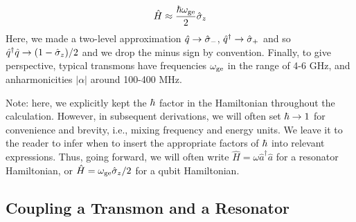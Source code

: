 \begin{equation}
    \hat{H} \approx \frac{\hbar\omega_{\rm ge}}{2}\hat{\sigma}_z
\end{equation}
Here, we made a two-level approximation $\hat{q} \to \hat{\sigma}_-$, $\hat{q}^\dagger \to \hat{\sigma}_+$ and so $\hat{q}^\dagger \hat{q} \to (1 - \hat{\sigma}_z)/2$ and we drop the minus sign by convention. Finally, to give perspective, typical transmons have frequencies $\omega_{\rm ge}$ in the range of 4-6 GHz, and anharmonicities $|\alpha|$ around 100-400 MHz. 

\noindent Note: here, we explicitly kept the $\hbar$ factor in the Hamiltonian throughout the calculation. However, in subsequent derivations, we will often set $\hbar \to 1$ for convenience and brevity, i.e., mixing frequency and energy units. We leave it to the reader to infer when to insert the appropriate factors of $\hbar$ into relevant expressions. Thus, going forward, we will often write $\hat{H} = \omega \hat{a}^\dagger\hat{a}$ for a resonator Hamiltonian, or $\hat{H} = \omega_{\rm ge}\hat{\sigma}_z/2$ for a qubit Hamiltonian. 

\subsection{Coupling a Transmon and a Resonator}

